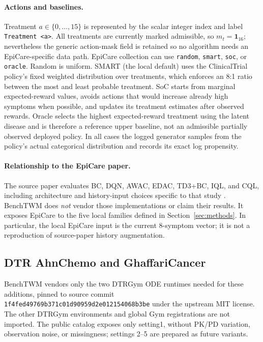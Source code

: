 \documentclass[10pt,twocolumn]{article}
\newcommand{\code}[1]{\texttt{#1}}
\begin{document}
\paragraph{Actions and baselines.}
Treatment $a\in\{0,\ldots,15\}$ is represented by the scalar integer index and label \code{Treatment <a>}. All treatments are currently marked admissible, so $m_t=\mathbf{1}_{16}$; nevertheless the generic action-mask field is retained so no algorithm needs an EpiCare-specific data path. EpiCare collection can use \code{random}, \code{smart}, \code{soc}, or \code{oracle}. Random is uniform. SMART (the local default) uses the ClinicalTrial policy's fixed weighted distribution over treatments, which enforces an 8:1 ratio between the most and least probable treatment. SoC starts from marginal expected-reward values, avoids actions that would increase already high symptoms when possible, and updates its treatment estimates after observed rewards. Oracle selects the highest expected-reward treatment using the latent disease and is therefore a reference upper baseline, not an admissible partially observed deployed policy. In all cases the logged generator samples from the policy's actual categorical distribution and records its exact log propensity.

\paragraph{Relationship to the EpiCare paper.}
The source paper evaluates BC, DQN, AWAC, EDAC, TD3+BC, IQL, and CQL, including architecture and history-input choices specific to that study \cite{hargrave2024epicare}. BenchTWM does \emph{not} vendor those implementations or claim their results. It exposes EpiCare to the five local families defined in Section~\ref{sec:methods}. In particular, the local EpiCare input is the current 8-symptom vector; it is not a reproduction of source-paper history augmentation.

\subsection{DTR AhnChemo and GhaffariCancer}
\label{sec:dtr}

BenchTWM vendors only the two DTRGym ODE runtimes needed for these additions,
pinned to source commit \code{1f4fed49769b371c01d90959d2e012154068b3be} under
the upstream MIT license. The other DTRGym environments and global Gym
registrations are not imported. The public catalog exposes only setting1,
without PK/PD variation, observation noise, or missingness; settings 2--5 are
prepared as future variants.
\end{document}
